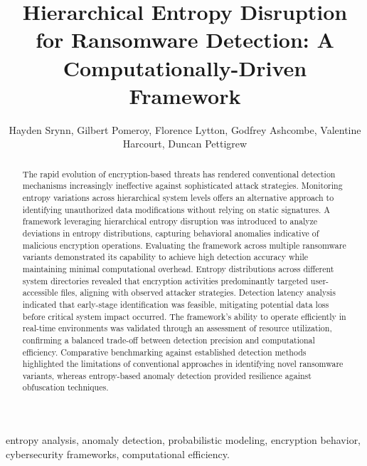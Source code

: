 \documentclass[lettersize,journal]{IEEEtran}
\begin{document}
\title{Hierarchical Entropy Disruption for Ransomware Detection: A Computationally-Driven Framework}

\author{Hayden Srynn, Gilbert Pomeroy, Florence Lytton, Godfrey Ashcombe, Valentine Harcourt, Duncan Pettigrew}


\maketitle



\begin{abstract}

The rapid evolution of encryption-based threats has rendered conventional detection mechanisms increasingly ineffective against sophisticated attack strategies. Monitoring entropy variations across hierarchical system levels offers an alternative approach to identifying unauthorized data modifications without relying on static signatures. A framework leveraging hierarchical entropy disruption was introduced to analyze deviations in entropy distributions, capturing behavioral anomalies indicative of malicious encryption operations. Evaluating the framework across multiple ransomware variants demonstrated its capability to achieve high detection accuracy while maintaining minimal computational overhead. Entropy distributions across different system directories revealed that encryption activities predominantly targeted user-accessible files, aligning with observed attacker strategies. Detection latency analysis indicated that early-stage identification was feasible, mitigating potential data loss before critical system impact occurred. The framework's ability to operate efficiently in real-time environments was validated through an assessment of resource utilization, confirming a balanced trade-off between detection precision and computational efficiency. Comparative benchmarking against established detection methods highlighted the limitations of conventional approaches in identifying novel ransomware variants, whereas entropy-based anomaly detection provided resilience against obfuscation techniques. 

\end{abstract}


\begin{IEEEkeywords}
entropy analysis, anomaly detection, probabilistic modeling, encryption behavior, cybersecurity frameworks, computational efficiency.
\end{IEEEkeywords}
\end{document}
